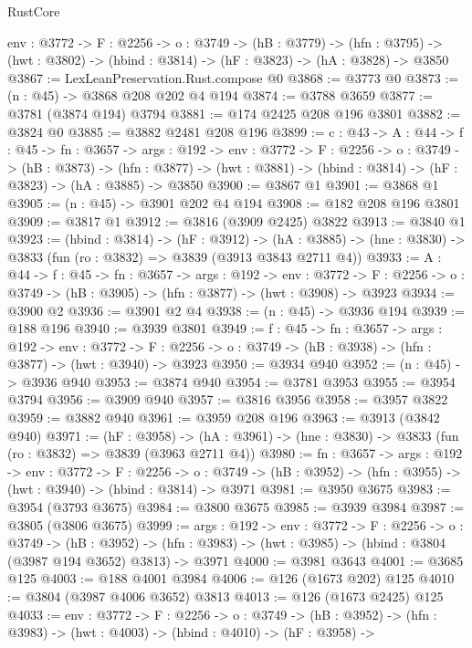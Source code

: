 \begin{lexlean}{RustCore}
\begin{coremodule}
  {env : @3772} ->
  {F : @2256} ->
  {o : @3749} ->
  (hB : @3779) ->
  (hfn : @3795) -> (hwt : @3802) -> (hbind : @3814) -> (hF : @3823) -> (hA : @3828) -> @3850
@3867 := LexLeanPreservation.Rust.compose @0
@3868 := @3773 @0
@3873 := (n : @45) -> @3868 @208 @202 @4 @194
@3874 := @3788 @3659
@3877 := @3781 (@3874 @194) @3794
@3881 := @174 @2425 @208 @196 @3801
@3882 := @3824 @0
@3885 := @3882 @2481 @208 @196
@3899 := {c : @43} ->
  {A : @44} ->
  {f : @45} ->
  {fn : @3657} ->
  {args : @192} ->
  {env : @3772} ->
  {F : @2256} ->
  {o : @3749} ->
  (hB : @3873) ->
  (hfn : @3877) -> (hwt : @3881) -> (hbind : @3814) -> (hF : @3823) -> (hA : @3885) -> @3850
@3900 := @3867 @1
@3901 := @3868 @1
@3905 := (n : @45) -> @3901 @202 @4 @194
@3908 := @182 @208 @196 @3801
@3909 := @3817 @1
@3912 := @3816 (@3909 @2425) @3822
@3913 := @3840 @1
@3923 := (hbind : @3814) ->
  (hF : @3912) ->
  (hA : @3885) -> (hne : @3830) -> @3833 (fun (ro : @3832) => @3839 (@3913 @3843 @2711 @4))
@3933 := {A : @44} ->
  {f : @45} ->
  {fn : @3657} ->
  {args : @192} ->
  {env : @3772} ->
  {F : @2256} -> {o : @3749} -> (hB : @3905) -> (hfn : @3877) -> (hwt : @3908) -> @3923
@3934 := @3900 @2
@3936 := @3901 @2 @4
@3938 := (n : @45) -> @3936 @194
@3939 := @188 @196
@3940 := @3939 @3801
@3949 := {f : @45} ->
  {fn : @3657} ->
  {args : @192} ->
  {env : @3772} ->
  {F : @2256} -> {o : @3749} -> (hB : @3938) -> (hfn : @3877) -> (hwt : @3940) -> @3923
@3950 := @3934 @940
@3952 := (n : @45) -> @3936 @940
@3953 := @3874 @940
@3954 := @3781 @3953
@3955 := @3954 @3794
@3956 := @3909 @940
@3957 := @3816 @3956
@3958 := @3957 @3822
@3959 := @3882 @940
@3961 := @3959 @208 @196
@3963 := @3913 (@3842 @940)
@3971 := (hF : @3958) ->
  (hA : @3961) -> (hne : @3830) -> @3833 (fun (ro : @3832) => @3839 (@3963 @2711 @4))
@3980 := {fn : @3657} ->
  {args : @192} ->
  {env : @3772} ->
  {F : @2256} ->
  {o : @3749} -> (hB : @3952) -> (hfn : @3955) -> (hwt : @3940) -> (hbind : @3814) -> @3971
@3981 := @3950 @3675
@3983 := @3954 (@3793 @3675)
@3984 := @3800 @3675
@3985 := @3939 @3984
@3987 := @3805 (@3806 @3675)
@3999 := {args : @192} ->
  {env : @3772} ->
  {F : @2256} ->
  {o : @3749} ->
  (hB : @3952) ->
  (hfn : @3983) -> (hwt : @3985) -> (hbind : @3804 (@3987 @194 @3652) @3813) -> @3971
@4000 := @3981 @3643
@4001 := @3685 @125
@4003 := @188 @4001 @3984
@4006 := @126 (@1673 @202) @125
@4010 := @3804 (@3987 @4006 @3652) @3813
@4013 := @126 (@1673 @2425) @125
@4033 := {env : @3772} ->
  {F : @2256} ->
  {o : @3749} ->
  (hB : @3952) ->
  (hfn : @3983) ->
  (hwt : @4003) ->
  (hbind : @4010) ->
  (hF : @3958) ->

\end{coremodule}
\end{lexlean}
